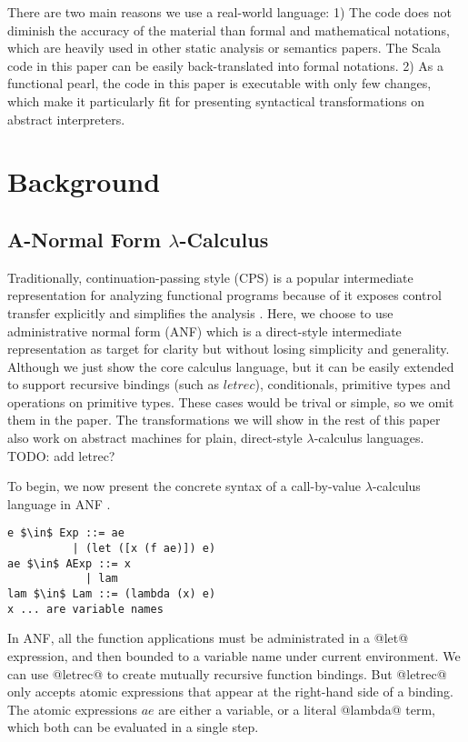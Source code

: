 \documentclass[acmsmall,review,anonymous]{acmart}\settopmatter{printfolios=true,printccs=false,printacmref=false}
\begin{document}
There are two main reasons we use a real-world language:
1) The code does not diminish the accuracy of the material
than formal and mathematical notations, 
which are heavily used in other static analysis or semantics papers.
The Scala code in this paper can be easily back-translated into formal notations.
2) As a functional pearl, the code in this paper is executable with only few changes, 
which make it particularly fit for presenting syntactical transformations on abstract
interpreters.

\section{Background} \label{background}

\subsection{A-Normal Form $\lambda$-Calculus} \label{anfsyntax}

Traditionally, continuation-passing style (CPS) is a popular intermediate representation
for analyzing functional programs because of it exposes control transfer explicitly
and simplifies the analysis \cite{Shivers:1991:SSC:115865.115884, Shivers:1988:CFA:53990.54007}.
Here, we choose to use administrative normal form (ANF) which is a direct-style intermediate representation 
as target for clarity but without losing simplicity and generality.
Although we just show the core calculus language, but it can be easily extended
to support recursive bindings (such as $letrec$), conditionals, primitive types and 
operations on primitive types. These cases would be trival or simple, so we omit them
in the paper.
The transformations we will show in the rest of this paper
also work on abstract machines for plain, direct-style $\lambda$-calculus languages.
TODO: add letrec?

To begin, we now present the concrete syntax of a call-by-value $\lambda$-calculus language 
in ANF \cite{flanagan1993essence}.

\begin{lstlisting}
e $\in$ Exp ::= ae
          | (let ([x (f ae)]) e)
ae $\in$ AExp ::= x            
            | lam
lam $\in$ Lam ::= (lambda (x) e)
x ... are variable names
\end{lstlisting}

In ANF, all the function applications must be administrated in a @let@ expression,
and then bounded to a variable name under current environment.
We can use @letrec@ to create mutually recursive function bindings. But @letrec@
only accepts atomic expressions that appear at the right-hand side of a binding.
The atomic expressions $ae$ are either a variable, or a literal @lambda@ term, which
both can be evaluated in a single step.
\end{document}
